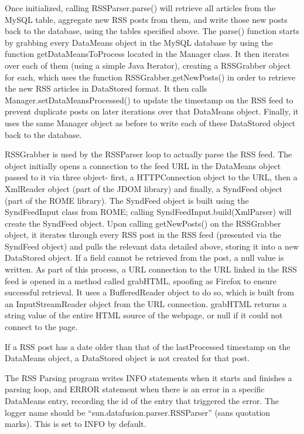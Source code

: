 \documentclass[11pt]{article} %
\begin{document}
Once initialized, calling RSSParser.parse() will retrieve all articles from the MySQL table, aggregate new RSS posts from them, and write those new posts back to the database, using the tables specified above. The parse() function starts by grabbing every DataMeans object in the MySQL database by using the function getDataMeansToProcess located in the Manager class. It then iterates over each of them (using a simple Java Iterator), creating a RSSGrabber object for each, which uses the function RSSGrabber.getNewPosts() in order to retrieve the new RSS articles in DataStored format. It then calls Manager.setDataMeansProcessed() to update the timestamp on the RSS feed to prevent duplicate posts on later iterations over that DataMeans object. Finally, it uses the same Manager object as before to write each of these DataStored object back to the database.

RSSGrabber is used by the RSSParser loop to actually parse the RSS feed. The object initially opens a connection to the feed URL in the DataMeans object passed to it via three object- first, a HTTPConnection object to the URL, then a XmlReader object (part of the JDOM library) and finally, a SyndFeed object (part of the ROME library). The SyndFeed object is built using the SyndFeedInput class from ROME; calling SyndFeedInput.build(XmlParser) will create the SyndFeed object. Upon calling getNewPosts() on the RSSGrabber object, it iterates through every RSS post in the RSS feed (presented via the SyndFeed object) and pulls the relevant data detailed above, storing it into a new DataStored object. If a field cannot be retrieved from the post, a null value is written. As part of this process, a URL connection to the URL linked in the RSS feed is opened in a method called grabHTML, spoofing as Firefox to ensure successful retrieval. It uses a BufferedReader object to do so, which is built from an InputStreamReader object from the URL connection. grabHTML returns a string value of the entire HTML source of the webpage, or null if it could not connect to the page.

If a RSS post has a date older than that of the lastProcessed timestamp on the DataMeans object, a DataStored object is not created for that post.

The RSS Parsing program writes INFO statements when it starts and finishes a parsing loop, and ERROR statement when there is an error in a specific DataMeans entry, recording the id of the entry that triggered the error. The logger name should be “sun.datafusion.parser.RSSParser” (sans quotation marks). This is set to INFO by default.
\end{document}
